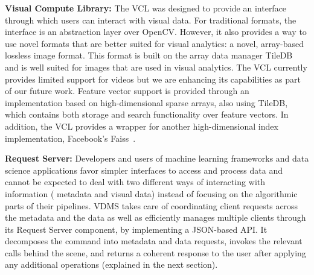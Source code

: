 \textbf{Visual Compute Library:} The VCL was designed to provide an interface
through which users can interact with visual data. For traditional formats,
the interface is an abstraction layer over OpenCV. However, it also provides a
way to use novel formats that are better suited for visual analytics: a novel,
array-based lossless image format. This format is built on the array data
manager TileDB~\cite{TileDB} and is well suited for images that are used in
visual analytics.
The VCL currently provides limited support for videos but we are enhancing
its capabilities as part of our future work.
Feature vector support is provided through an implementation based
on high-dimensional sparse arrays, also using TileDB, which contains both
storage and search functionality over feature vectors.
In addition, the VCL provides a wrapper
for another high-dimensional index implementation,
Facebook's Faiss~\cite{faiss}.

\textbf{Request Server:}
Developers and users of machine learning frameworks and data science
applications favor simpler interfaces to access and process data and cannot
be expected to deal with two different ways of interacting with information (
metadata and visual data) instead of focusing on the algorithmic parts of their
pipelines.
VDMS takes care of coordinating client requests across the metadata and the
data as well as efficiently manages multiple clients through its Request
Server component, by implementing a JSON-based API.
It decomposes the command into
metadata and data requests, invokes the relevant calls behind the scene,
and returns a coherent response to the user after applying any additional
operations (explained in the next section).

